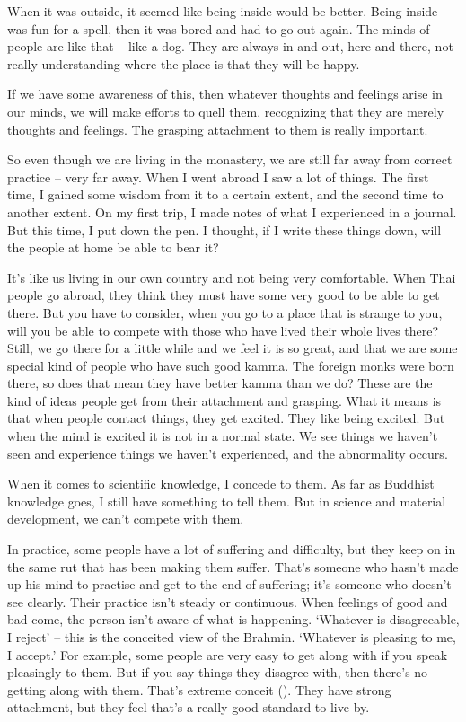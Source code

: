 When it was outside, it seemed like being inside would be better. Being inside was fun for a spell, then it was bored and had to go out again. The minds of people are like that -- like a dog. They are always in and out, here and there, not really understanding where the place is that they will be happy.

If we have some awareness of this, then whatever thoughts and feelings arise in our minds, we will make efforts to quell them, recognizing that they are merely thoughts and feelings. The grasping attachment to them is really important.

So even though we are living in the monastery, we are still far away from correct practice -- very far away. When I went abroad I saw a lot of things. The first time, I gained some wisdom from it to a certain extent, and the second time to another extent. On my first trip, I made notes of what I experienced in a journal. But this time, I put down the pen. I thought, if I write these things down, will the people at home be able to bear it?

It's like us living in our own country and not being very comfortable. When Thai people go abroad, they think they must have some very good  to be able to get there. But you have to consider, when you go to a place that is strange to you, will you be able to compete with those who have lived their whole lives there? Still, we go there for a little while and we feel it is so great, and that we are some special kind of people who have such good kamma. The foreign monks were born there, so does that mean they have better kamma than we do? These are the kind of ideas people get from their attachment and grasping. What it means is that when people contact things, they get excited. They like being excited. But when the mind is excited it is not in a normal state. We see things we haven't seen and experience things we haven't experienced, and the abnormality occurs.

When it comes to scientific knowledge, I concede to them. As far as Buddhist knowledge goes, I still have something to tell them. But in science and material development, we can't compete with them.

In practice, some people have a lot of suffering and difficulty, but they keep on in the same rut that has been making them suffer. That's someone who hasn't made up his mind to practise and get to the end of suffering; it's someone who doesn't see clearly. Their practice isn't steady or continuous. When feelings of good and bad come, the person isn't aware of what is happening. `Whatever is disagreeable, I reject' -- this is the conceited view of the Brahmin. `Whatever is pleasing to me, I accept.' For example, some people are very easy to get along with if you speak pleasingly to them. But if you say things they disagree with, then there's no getting along with them. That's extreme conceit (). They have strong attachment, but they feel that's a really good standard to live by.

